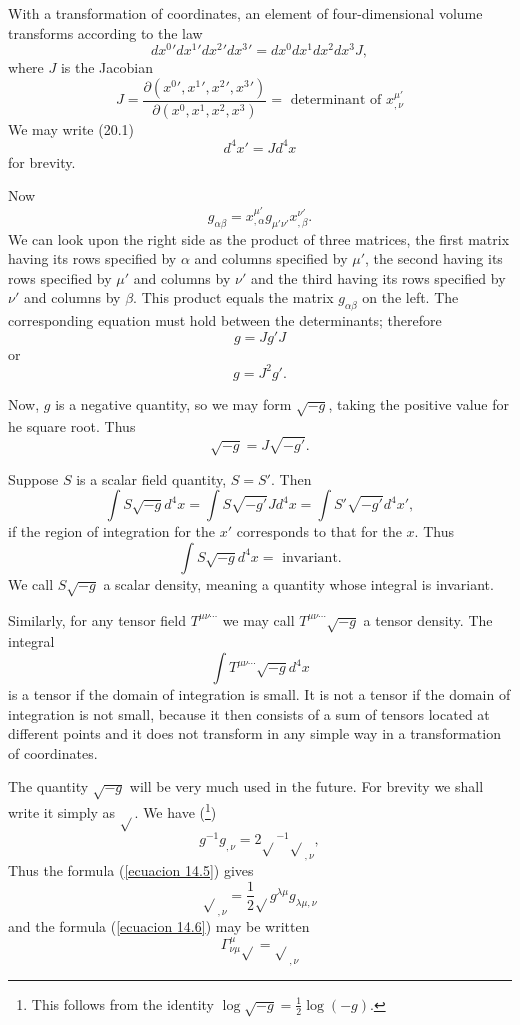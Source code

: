 With a transformation of coordinates, an element of four-dimensional volume transforms according to the law
\begin{equation}
 \label{ecuacion 20.1}
 {dx^0}'{dx^1}'{dx^2}'{dx^3}' = {dx^0}{dx^1}{dx^2}{dx^3} J,
\end{equation}
where $J$ is the Jacobian
\[
 J = \frac{\partial({x^0}',{x^1}',{x^2}',{x^3}')}{\partial({x^0},{x^1},{x^2},{x^3})}
 = \mbox{ determinant of } x^{\mu'}_{,\nu}
\]
We may write (20.1)
\begin{equation}
 \label{ecuacion 20.2}
 d^4 x' = J d^4 x
\end{equation}
for brevity.

Now
\[
   g_{\alpha\beta} = x^{\mu'}_{,\alpha} g_{\mu'\nu'} x^{\nu'}_{,\beta}.
\]
We can look upon the right side as the product of three matrices, the first matrix having its rows specified by 
$\alpha$ and columns specified by $\mu'$, the second having its rows specified by $\mu'$ and columns by $\nu'$ and the 
third having its rows specified by $\nu'$ and columns by $\beta$. This product equals the matrix $g_{\alpha\beta}$ on 
the left. The corresponding equation must hold between the determinants; therefore
\[
 g = J g' J
\]
or
\[
 g = J^2 g'.
\]

Now, $g$ is a negative quantity, so we may form $\sqrt{-g}$, taking the positive value for he square root. Thus
\begin{equation}
 \label{ecuacion 20.3}
 \sqrt{-g} = J \sqrt{- g'}.
\end{equation}

Suppose $S$ is a scalar field quantity, $S = S'$. Then
\[
\int{S \sqrt{-g} d^4 x} = \int{S \sqrt{-g'} J d^4 x} = \int{S' \sqrt{-g'} d^4 x'},
\]
if the region of integration for the $x'$ corresponds to that for the $x$. Thus
\begin{equation}
 \label{ecuacion 20.4}
 \int{S \sqrt{-g} d^4 x} = \mbox{ invariant.}
\end{equation}
We call $S \sqrt{-g}$ a scalar density, meaning a quantity whose integral is invariant.

Similarly, for any tensor field $T^{\mu\nu\cdots}$ we may call $T^{\mu\nu\cdots}\sqrt{-g}$ a tensor density. The 
integral
\[
   \int{T^{\mu\nu\cdots}\sqrt{-g} d^4 x}
\]
is a tensor if the domain of integration is small. It is not a tensor if the domain of integration is not small, 
because it then consists of a sum of tensors located at different points and it does not transform in any simple way in 
a transformation of coordinates.

The quantity $\sqrt{-g}$ will be very much used in the future. For brevity we shall write it simply as $\sqrt{}$. We 
have (\footnote{This follows from the identity $\log \sqrt{-g } = \frac{1}{2} \log (-g) $.})
\[
 g^{-1} g_{,\nu} = 2 {\sqrt{}}^{-1} {\sqrt{}}_{,\nu}, 
\]
Thus the formula (\ref{ecuacion 14.5}) gives 
\begin{equation}
 \label{ecuacion 20.5}
 \sqrt{}_{,\nu} = \frac{1}{2} \sqrt{} g^{\lambda\mu}g_{\lambda\mu,\nu}
\end{equation}
and the formula (\ref{ecuacion 14.6}) may be written
\begin{equation}
 \label{ecuacion 20.6}
 \Gamma^\mu_{\nu\mu}\sqrt{} = \sqrt{}_{,\nu}
\end{equation}
